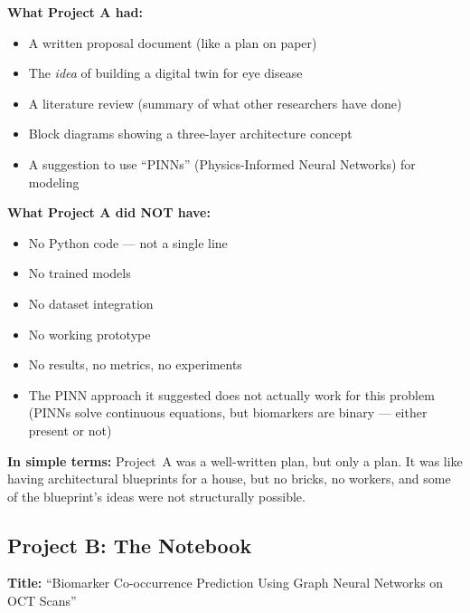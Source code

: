 \documentclass[12pt,a4paper]{article}
\begin{document}
\begin{mdframed}[style=beforebox]
\textbf{What Project A had:}
\begin{itemize}[nosep]
  \item A written proposal document (like a plan on paper)
  \item The \emph{idea} of building a digital twin for eye disease
  \item A literature review (summary of what other researchers have done)
  \item Block diagrams showing a three-layer architecture concept
  \item A suggestion to use ``PINNs'' (Physics-Informed Neural Networks) for modeling
\end{itemize}

\textbf{What Project A did NOT have:}
\begin{itemize}[nosep]
  \item No Python code --- not a single line
  \item No trained models
  \item No dataset integration
  \item No working prototype
  \item No results, no metrics, no experiments
  \item The PINN approach it suggested does not actually work for this problem (PINNs solve continuous equations, but biomarkers are binary --- either present or not)
\end{itemize}
\end{mdframed}

\textbf{In simple terms:} Project~A was a well-written plan, but only a plan. It was like having architectural blueprints for a house, but no bricks, no workers, and some of the blueprint's ideas were not structurally possible.

\subsection{Project B: The Notebook}

\textbf{Title:} ``Biomarker Co-occurrence Prediction Using Graph Neural Networks on OCT Scans''
\end{document}
